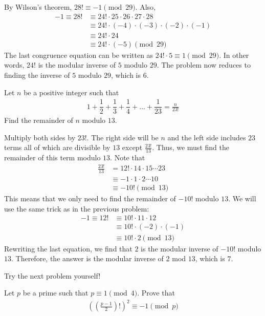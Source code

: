 \documentclass{subfile}
\begin{document}
		\begin{solution}
			By Wilson's theorem, $28! \equiv -1 \pmod{29}$. Also,
				\begin{align*}
					-1 \equiv 28! &\equiv 24! \cdot 25 \cdot 26 \cdot 27 \cdot 28\\
					    &\equiv 24! \cdot (-4) \cdot (-3) \cdot (-2) \cdot (-1)\\
					    &\equiv 24! \cdot 24\\
					    &\equiv 24! \cdot (-5)\pmod{29}
				\end{align*}
			The last congruence equation can be written as $24! \cdot 5 \equiv 1 \pmod{29}$. In other words, $24!$ is the modular inverse of $5$ modulo $29$. The problem now reduces to finding the inverse of $5$ modulo $29$, which is $6$.

		\end{solution}

		\begin{problem}
			Let $n$ be a positive integer such that
				\begin{align*}
					1 + \dfrac{1}{2} + \dfrac{1}{3} + \dfrac{1}{4} +\ldots + \dfrac{1}{23} = \frac{n}{23!}
				\end{align*}
			Find the remainder of $n$ modulo $13$.
		\end{problem}

		\begin{solution}
			Multiply both sides by $23!$. The right side will be $n$ and the left side includes $23$ terms all of which are divisible by $13$ except $\frac{23!}{13}$. Thus, we must find the remainder of this term modulo $13$. Note that
				\begin{align*}
					\frac{23!}{13} &= 12! \cdot 14 \cdot 15 \cdots 23\\
								   &\equiv -1 \cdot 1 \cdot 2 \cdots 10\\
								   &\equiv -10! \pmod{13}
				\end{align*}
			This means that we only need to find the remainder of $-10!$ modulo $13$. We will use the same trick as in the previous problem:
				\begin{align*}
					-1 \equiv 12! &\equiv 10! \cdot 11 \cdot 12\\
						&\equiv 10! \cdot (-2) \cdot (-1)\\
						&\equiv 10! \cdot 2\pmod{13}
				\end{align*}
			Rewriting the last equation, we find that $2$ is the modular inverse of $-10!$ modulo $13$. Therefore, the answer is the modular inverse of $2$ mod $13$, which is $7$.
		\end{solution}
	Try the next problem yourself!
		\begin{problem}
			Let $p$ be a prime such that $p \equiv 1 \pmod 4$. Prove that
				\begin{align*}
					\left(\left(\frac{p-1}{2}\right)!\right)^2 \equiv -1 \pmod p
				\end{align*}
		\end{problem}
\end{document}
